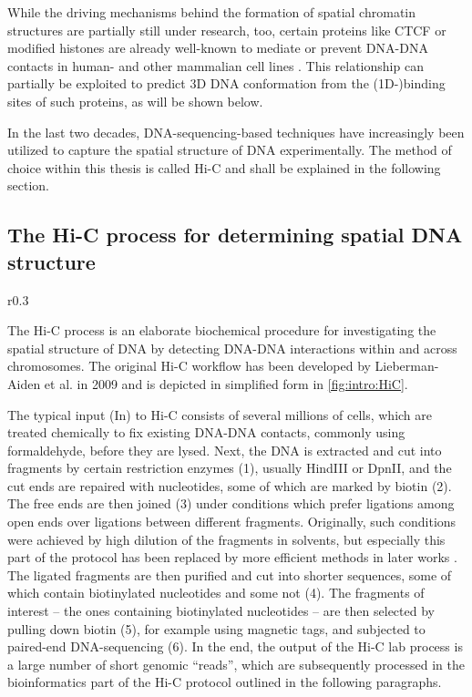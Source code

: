 While the driving mechanisms behind the formation of spatial chromatin structures are partially still under research, too,
certain proteins like CTCF or modified histones are already well-known to mediate or prevent DNA-DNA contacts in human- and other mammalian cell lines \cite{Phillips2009,PhillipsCremins2013,Dixon2015}.
This relationship can partially be exploited to predict 3D DNA conformation from the (1D\mbox{-})binding sites of such proteins, as will be shown below.

In the last two decades, DNA-sequencing-based techniques have increasingly been utilized to capture the spatial structure of DNA experimentally.
The method of choice within this thesis is called Hi-C and shall be explained in the following section.

\subsection{The Hi-C process for determining spatial DNA structure} \label{sec:intro:hic}
\begin{wrapfigure}[34]{r}{0.3\textwidth}
 \vspace{-7mm}
 \caption{Hi-C lab process}
 \label{fig:intro:HiC}
\end{wrapfigure}
The Hi-C process is an elaborate biochemical procedure for investigating the 
spatial structure of DNA by detecting DNA-DNA interactions within and 
across chromosomes.
The original Hi-C workflow has been developed by Lieberman-Aiden et al. in 2009  \cite{LiebermanAiden2009}
and is depicted in simplified form in \cref{fig:intro:HiC}.

The typical input (In) to Hi-C consists of several millions of cells,
which are treated chemically to fix existing DNA-DNA contacts, 
commonly using formaldehyde, before they are lysed.
Next, the DNA is extracted and cut into fragments by certain restriction enzymes (1),
usually HindIII or DpnII, 
and the cut ends are repaired with nucleotides, some of which are marked by biotin (2).
The free ends are then joined (3) under conditions which prefer
ligations among open ends over ligations between different fragments.
Originally, such conditions were achieved by high dilution of the fragments in
solvents, but especially this part of the protocol has been replaced by 
more efficient methods in later works \cite{Rao2014,Belaghzal2017}.
The ligated fragments are then purified and cut into shorter sequences,
some of which contain biotinylated nucleotides and some not (4).
The fragments of interest -- the ones containing biotinylated nucleotides -- 
are then selected by pulling down biotin (5), for example using magnetic tags,  
and subjected to paired-end DNA-sequencing (6).
In the end, the output of the Hi-C lab process is a large number of short genomic ``reads'',
which are subsequently processed in the bioinformatics part of the Hi-C protocol 
outlined in the following paragraphs.

